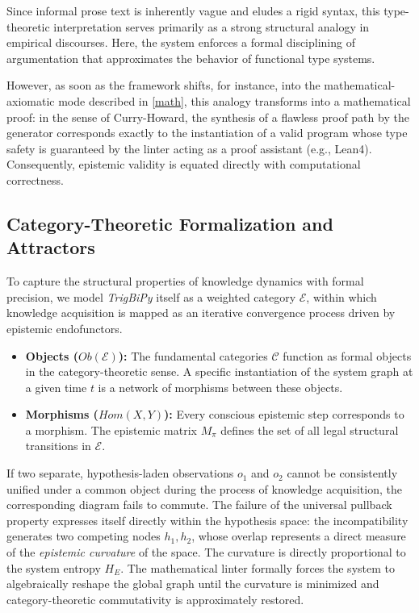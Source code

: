 \documentclass[11pt, a4paper]{article}
\begin{document}
	Since informal prose text is inherently vague and eludes a rigid syntax, this type-theoretic interpretation serves primarily as a strong structural analogy in empirical discourses. Here, the system enforces a formal disciplining of argumentation that approximates the behavior of functional type systems. 
	
	However, as soon as the framework shifts, for instance, into the mathematical-axiomatic mode described in \ref{math}, this analogy transforms into a mathematical proof: in the sense of Curry-Howard, the synthesis of a flawless proof path by the generator corresponds exactly to the instantiation of a valid program whose type safety is guaranteed by the linter acting as a proof assistant (e.g., Lean4). Consequently, epistemic validity is equated directly with computational correctness.
	
	\subsection{Category-Theoretic Formalization and Attractors}
	To capture the structural properties of knowledge dynamics with formal precision, we model \emph{TrigBiPy} itself as a weighted category $\mathcal{E}$, within which knowledge acquisition is mapped as an iterative convergence process driven by epistemic endofunctors.
	
	\begin{itemize}
		\item \textbf{Objects ($Ob(\mathcal{E})$):} The fundamental categories $\mathcal{C}$ function as formal objects in the category-theoretic sense. A specific instantiation of the system graph at a given time $t$ is a network of morphisms between these objects.
		\item \textbf{Morphisms ($Hom(X, Y)$):} Every conscious epistemic step corresponds to a morphism. The epistemic matrix $M_\pi$ defines the set of all legal structural transitions in $\mathcal{E}$.
	\end{itemize}
	
	If two separate, hypothesis-laden observations $o_1$ and $o_2$ cannot be consistently unified under a common object during the process of knowledge acquisition, the corresponding diagram fails to commute. The failure of the universal pullback property expresses itself directly within the hypothesis space: the incompatibility generates two competing nodes $h_1, h_2$, whose overlap represents a direct measure of the \emph{epistemic curvature} of the space. The curvature is directly proportional to the system entropy $H_E$. The mathematical linter formally forces the system to algebraically reshape the global graph until the curvature is minimized and category-theoretic commutativity is approximately restored.
	
\end{document}
